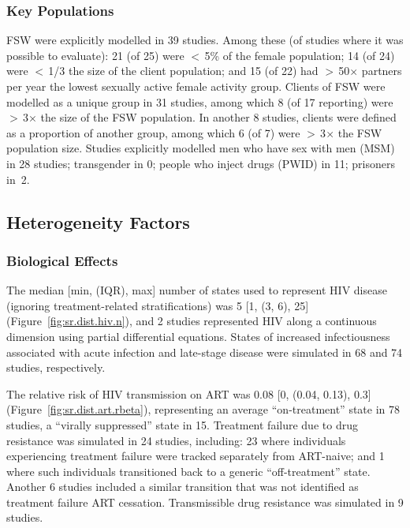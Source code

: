 \subsubsection{Key Populations}\label{sr.res.context.kp}
FSW were explicitly modelled in 39 studies.
Among these (of studies where it was possible to evaluate):
21 (of 25) were {$<$\,5\%} of the female population;
14 (of 24) were {$<$\,1/3} the size of the client population; and
15 (of 22) had {$>$\,50$\times$} partners per year \vs
the lowest sexually active female activity group.
Clients of FSW were modelled as a unique group in 31 studies,
among which 8 (of 17 reporting) were {$>$\,3$\times$} the size of the FSW population.
In another 8 studies, clients were defined as a proportion of another group,
among which 6 (of 7) were {$>$\,3$\times$} the FSW population size.
Studies explicitly modelled men who have sex with men (MSM) in 28 studies;
transgender in 0; people who inject drugs (PWID) in 11; prisoners in~2.
\subsection{Heterogeneity Factors}\label{sr.res.f}
\subsubsection{Biological Effects}\label{sr.res.f.bio}
The median [min, (IQR), max] number of states used to represent HIV disease
(ignoring treatment-related stratifications) was 5 [1, (3, 6), 25] (Figure~\ref{fig:sr.dist.hiv.n}),
and 2 studies represented HIV along a continuous dimension using partial differential equations.
States of increased infectiousness associated with acute infection and late-stage disease
were simulated in 68 and 74 studies, respectively.
\par
The relative risk of HIV transmission on ART was 0.08 [0, (0.04, 0.13), 0.3]
(Figure~\ref{fig:sr.dist.art.rbeta}),
representing an average ``on-treatment'' state in 78 studies,
\vs a ``virally suppressed'' state in 15.
Treatment failure due to drug resistance was simulated in 24 studies, including:
23 where individuals experiencing treatment failure were tracked separately from ART-naive;
and 1 where such individuals transitioned back to a generic ``off-treatment'' state.
Another 6 studies included a similar transition
that was not identified as treatment failure \vs ART cessation.
Transmissible drug resistance was simulated in 9 studies.
